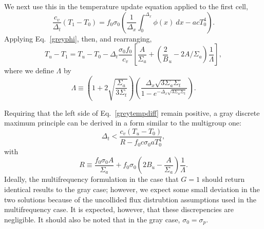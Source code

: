 We next use this in the temperature update equation applied to the first cell,
\[\frac{c_v}{\Delta_t}(T_1-T_0)=f_0\sigma_0
  \left(\frac{1}{\Delta_x}\int_0^{\Delta_x}\phi(x)\ dx - acT_0^4\right).\]
Applying Eq.\ \eqref{greyphi}, then, and rearranging,
\begin{equation}\label{greytempdiff}
T_u-T_1=T_u-T_0-\Delta_t\frac{\sigma_0f_0}{c_v}
  \left[\frac{A}{\Sigma_a} + \left(\frac2B_u-2A/\Sigma_a\right)\frac{1}{\Lambda}
\right],
\end{equation}
where we define $\Lambda$ by
\[\Lambda\equiv \left(1+2\sqrt{\frac{\Sigma_a}{3\Sigma_t}}\right)
  \left(\frac{\Delta_x\sqrt{3\Sigma_a\Sigma_t}}
    {1-e^{-\Delta_x\sqrt{3\Sigma_a\Sigma_t}}}\right).\]

Requiring that the left side of Eq.\ \eqref{greytempdiff} remain positive, a
gray
discrete maximum principle can be derived in a form similar to the multigroup one:
\begin{equation}
\Delta_t<\frac{c_v(T_u-T_0)}{R-f_0c\sigma_0aT_0^4},
\end{equation}
with
\[R\equiv\frac{f_0\sigma_0A}{\Sigma_a} + 
  f_0\sigma_0\left(2B_u-\frac{A}{\Sigma_a}\right)\frac{1}{\Lambda}.\]
Ideally, the multifrequency formulation in the case that $G=1$ should return
identical results to the gray case; however, we expect some small deviation in
the two solutions because of the uncollided flux distrubtion assumptions used
in the multifrequency case.  It is expected, however, that these discrepencies
are negligible.
It should also be noted that in the gray case, $\sigma_0=\sigma_p$.
\belowSubSecSkip



